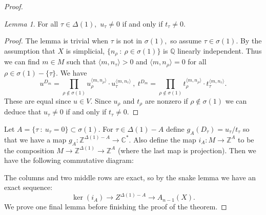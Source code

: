 \documentclass[BSc]{usydthesis}
\numberwithin{equation}{chapter}
\theoremstyle{remark}
\newtheorem{Lemma}[equation]{Lemma}
\newcommand{\C}{\mathbb{C}}
\newcommand{\Z}{\mathbb{Z}}
\begin{document}
\begin{proof}
\begin{Lemma}
 For all $\tau\in \Delta(1),$ $u_{\tau}\neq 0$ if and only if $t_{\tau}\neq 0.$
\end{Lemma}

  \begin{proof}
  The lemma is trivial when $\tau$ is not in $\sigma(1),$ so assume $\tau\in \sigma(1).$ By the assumption that $X$ is simplicial, $\{ n_{\rho} \ : \ \rho\in \sigma(1)\}$ is $\mathbb{Q}$ linearly independent. Thus we can find $m\in M$ such that $\langle m, n_{\tau} \rangle >0$ and $\langle m, n_{\rho} \rangle =0$ for all $\rho \in \sigma(1)-\{\tau\}.$ We have $$ u^{D_m} = \prod_{\rho\notin \sigma(1)} u_{\rho}^{ \langle m, n_{\rho} \rangle} \cdot u_{\tau}^{ \langle m, n_{\tau} \rangle } \ , \ t^{D_m} = \prod_{\rho\notin \sigma(1)} t_{\rho}^{ \langle m, n_{\rho} \rangle} \cdot t_{\tau}^{ \langle m, n_{\tau} \rangle }.$$ These are equal since $u\in V.$ Since $u_{\rho}$ and $t_{\rho}$ are nonzero if $\rho\notin \sigma(1)$ we can deduce that $u_{\tau}\neq 0$ if and only if $t_{\tau}\neq 0.$
  \end{proof}
 
Let $A= \{ \tau \ : \ u_{\tau}=0\} \subset \sigma(1).$ For $\tau\in \Delta(1)-A$ define $g_A( D_{\tau} ) = u_{\tau}/t_{\tau}$ so that we have a map $g_A: \Z^{\Delta(1) - A} \to \C^*.$ Also define the map $i_A:M \to \Z^A$ to be the composition $M\to \Z^{\Delta(1)} \to \Z^A$ (where the last map is projection). Then we have the following commutative diagram: 

\begin{center}
\end{center}

The columns and two middle rows are exact, so by the snake lemma we have an exact sequence: $$ \operatorname{ker}(i_A)\to Z^{\Delta(1)-A} \to A_{n-1}(X).$$ We prove one final lemma before finishing the proof of the theorem.


\end{proof}
\end{document}
